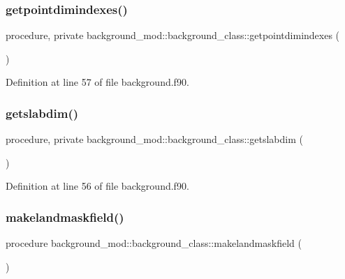 \subsubsection{\texorpdfstring{getpointdimindexes()}{getpointdimindexes()}}
{\footnotesize\ttfamily procedure, private background\+\_\+mod\+::background\+\_\+class\+::getpointdimindexes (\begin{DoxyParamCaption}{ }\end{DoxyParamCaption})\hspace{0.3cm}{\ttfamily [private]}}



Definition at line 57 of file background.\+f90.

\mbox{\label{structbackground__mod_1_1background__class_ac7e39271ba1838a3f1548f10ff658de1}} 
\subsubsection{\texorpdfstring{getslabdim()}{getslabdim()}}
{\footnotesize\ttfamily procedure, private background\+\_\+mod\+::background\+\_\+class\+::getslabdim (\begin{DoxyParamCaption}{ }\end{DoxyParamCaption})\hspace{0.3cm}{\ttfamily [private]}}



Definition at line 56 of file background.\+f90.

\mbox{\label{structbackground__mod_1_1background__class_a0ecab872ceea6e2ad4274daa4670459e}} 
\subsubsection{\texorpdfstring{makelandmaskfield()}{makelandmaskfield()}}
{\footnotesize\ttfamily procedure background\+\_\+mod\+::background\+\_\+class\+::makelandmaskfield (\begin{DoxyParamCaption}{ }\end{DoxyParamCaption})\hspace{0.3cm}{\ttfamily [private]}}



